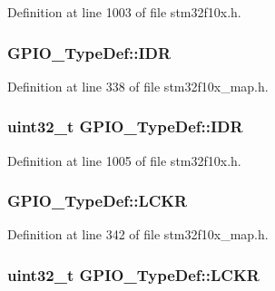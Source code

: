 Definition at line 1003 of file stm32f10x.\+h.

\subsubsection[{\texorpdfstring{I\+DR}{IDR}}]{ G\+P\+I\+O\+\_\+\+Type\+Def\+::\+I\+DR}\hypertarget{struct_g_p_i_o___type_def_a1c58da24e118c30a2e0fbc13a2639c5e}{}\label{struct_g_p_i_o___type_def_a1c58da24e118c30a2e0fbc13a2639c5e}


Definition at line 338 of file stm32f10x\+\_\+map.\+h.

\subsubsection[{\texorpdfstring{I\+DR}{IDR}}]{ {\bf uint32\+\_\+t} G\+P\+I\+O\+\_\+\+Type\+Def\+::\+I\+DR}\hypertarget{struct_g_p_i_o___type_def_acf11156409414ad8841bb0b62959ee96}{}\label{struct_g_p_i_o___type_def_acf11156409414ad8841bb0b62959ee96}


Definition at line 1005 of file stm32f10x.\+h.

\subsubsection[{\texorpdfstring{L\+C\+KR}{LCKR}}]{ G\+P\+I\+O\+\_\+\+Type\+Def\+::\+L\+C\+KR}\hypertarget{struct_g_p_i_o___type_def_a0e88914f49c0296dd4fa1323f65b0b0d}{}\label{struct_g_p_i_o___type_def_a0e88914f49c0296dd4fa1323f65b0b0d}


Definition at line 342 of file stm32f10x\+\_\+map.\+h.

\subsubsection[{\texorpdfstring{L\+C\+KR}{LCKR}}]{ {\bf uint32\+\_\+t} G\+P\+I\+O\+\_\+\+Type\+Def\+::\+L\+C\+KR}\hypertarget{struct_g_p_i_o___type_def_a95a59d4b1d52be521f3246028be32f3e}{}\label{struct_g_p_i_o___type_def_a95a59d4b1d52be521f3246028be32f3e}


